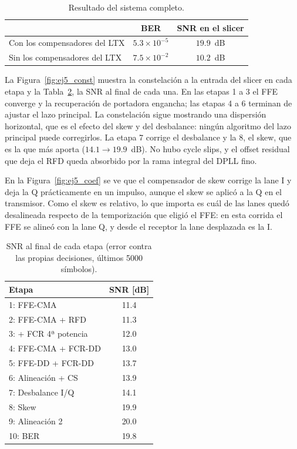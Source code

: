 \begin{table}[H]
\centering
\small
\begin{tabular}{lcc}
\toprule
& BER & SNR en el slicer \\
\midrule
Con los compensadores del LTX & $5.3\times10^{-5}$ & $19.9$~dB \\
Sin los compensadores del LTX & $7.5\times10^{-2}$ & $10.2$~dB \\
\bottomrule
\end{tabular}
\caption{Resultado del sistema completo.}
\label{tab:ej5_res}
\end{table}

La Figura~\ref{fig:ej5_const} muestra la constelación a la entrada del
slicer en cada etapa y la Tabla~\ref{tab:ej5_snr}, la SNR al final de
cada una. En las etapas 1 a 3 el FFE converge y la recuperación de
portadora engancha; las etapas 4 a 6 terminan de ajustar el lazo
principal. La constelación sigue mostrando una dispersión horizontal, que
es el efecto del skew y del desbalance: ningún algoritmo del lazo
principal puede corregirlos. La etapa 7 corrige el desbalance y la 8, el
skew, que es la que más aporta ($14.1 \rightarrow 19.9$~dB). No hubo
cycle slips, y el offset residual que deja el RFD queda absorbido por la
rama integral del DPLL fino.

En la Figura~\ref{fig:ej5_coef} se ve que el compensador de skew corrige
la lane I y deja la Q prácticamente en un impulso, aunque el skew se
aplicó a la Q en el transmisor. Como el skew es relativo, lo que importa
es cuál de las lanes quedó desalineada respecto de la temporización que
eligió el FFE: en esta corrida el FFE se alineó con la lane Q, y desde el
receptor la lane desplazada es la I.

\begin{table}[H]
\centering
\small
\begin{tabular}{lc}
\toprule
Etapa & SNR [dB] \\
\midrule
1: FFE-CMA            & 11.4 \\
2: FFE-CMA + RFD      & 11.3 \\
3: + FCR 4ª potencia  & 12.0 \\
4: FFE-CMA + FCR-DD   & 13.0 \\
5: FFE-DD + FCR-DD    & 13.7 \\
6: Alineación + CS    & 13.9 \\
7: Desbalance I/Q     & 14.1 \\
8: Skew               & 19.9 \\
9: Alineación 2       & 20.0 \\
10: BER               & 19.8 \\
\bottomrule
\end{tabular}
\caption{SNR al final de cada etapa (error contra las propias decisiones,
últimos 5000 símbolos).}
\label{tab:ej5_snr}
\end{table}

